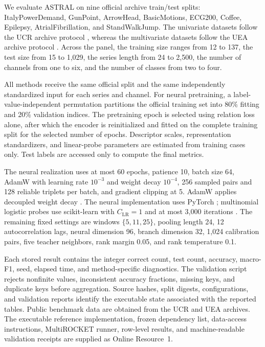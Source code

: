 \documentclass[pdflatex,sn-mathphys-num]{sn-jnl}
\newcommand{\1}{\mathbf{1}}
\theoremstyle{plain}
\begin{document}
	We evaluate ASTRAL on nine official archive train/test splits: ItalyPowerDemand, GunPoint, ArrowHead, BasicMotions, ECG200, Coffee, Epilepsy, AtrialFibrillation, and StandWalkJump. The univariate datasets follow the UCR archive protocol \cite{dau2019ucr}, whereas the multivariate datasets follow the UEA archive protocol \cite{ruiz2021uea}. Across the panel, the training size ranges from 12 to 137, the test size from 15 to 1,029, the series length from 24 to 2,500, the number of channels from one to six, and the number of classes from two to four.

	All methods receive the same official split and the same independently standardized input for each series and channel. For neural pretraining, a label-value-independent permutation partitions the official training set into 80\% fitting and 20\% validation indices. The pretraining epoch is selected using relation loss alone, after which the encoder is reinitialized and fitted on the complete training split for the selected number of epochs. Descriptor scales, representation standardizers, and linear-probe parameters are estimated from training cases only. Test labels are accessed only to compute the final metrics.
	
	The neural realization uses at most 60 epochs, patience 10, batch size 64, AdamW with learning rate $10^{-3}$ and weight decay $10^{-4}$, 256 sampled pairs and 128 reliable triplets per batch, and gradient clipping at 5. AdamW applies decoupled weight decay \cite{loshchilov2019adamw}. The neural implementation uses PyTorch \cite{paszke2019pytorch}; multinomial logistic probes use scikit-learn with $C_{\mathrm{LR}}=1$ and at most 3,000 iterations \cite{pedregosa2011sklearn}. The remaining fixed settings are windows $\{5,11,25\}$, pooling length 24, 12 autocorrelation lags, neural dimension 96, branch dimension 32, 1,024 calibration pairs, five teacher neighbors, rank margin 0.05, and rank temperature 0.1.
	
	Each stored result contains the integer correct count, test count, accuracy, macro-F1, seed, elapsed time, and method-specific diagnostics. The validation script rejects nonfinite values, inconsistent accuracy fractions, missing keys, and duplicate keys before aggregation. Source hashes, split digests, configurations, and validation reports identify the executable state associated with the reported tables. Public benchmark data are obtained from the UCR and UEA archives. The executable reference implementation, frozen dependency list, data-access instructions, MultiROCKET runner, row-level results, and machine-readable validation receipts are supplied as Online Resource~1.
\end{document}
